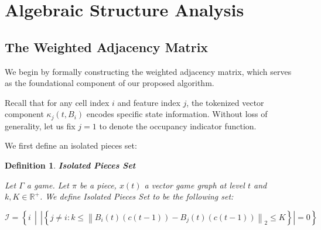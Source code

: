 \documentclass[11pt,a4paper]{article}
\theoremstyle{plain}
\newtheorem{definition}{Definition}[section]
\theoremstyle{definition}
\begin{document}
\vspace{0.5em}

\newpage


\section{Algebraic Structure Analysis}
\label{sec:topological-analysis}

\vspace{0.5em}

\subsection{The Weighted Adjacency Matrix}
\label{sec:weighted-matrix}

\vspace{0.5em}

We begin by formally constructing the weighted adjacency matrix, which serves as the foundational component of our proposed algorithm.

\vspace{0.5em}

Recall that for any cell index $i$ and feature index $j$, the tokenized vector component $\kappa_j(t, B_i)$ encodes specific state information. Without loss of generality, let us fix $j = 1$ to denote the occupancy indicator function.

\vspace{0.5em}

We first define an isolated pieces set:

\vspace{0.5em}

\begin{definition}\textbf{Isolated Pieces Set}

\vspace{0.5em}

Let $\Gamma$ a game. Let $\pi$ be a piece, $x(t)$ a vector game graph at level $t$ and $k, K \in \mathbb{R}^{+}$. We define \emph{Isolated Pieces Set} to be the following set:

\vspace{0.5em}

\begin{equation}
\mathcal{I} = \left\{ i \,\middle|\, 
\left|\left\{ j \neq i : 
k \le \left\lVert B_i(t)\!\left(c(t-1)\right) - B_j(t)\!\left(c(t-1)\right)\right\rVert_2 \le K 
\right\}\right| = 0
\right\}
\end{equation}
\label{def:Isolated_Pieces_Set}
\end{definition}
\end{document}
